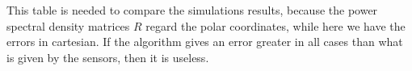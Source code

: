 \documentclass[twocolumn]{article}
\begin{document}
\begin{center}
\end{center}
This table is needed to compare the simulations results, because the power spectral density matrices $R$ regard the polar coordinates, while here
 we have the errors in cartesian. If the algorithm gives an error greater in all cases than what is given by the sensors, 
then it is useless.
\end{document}
